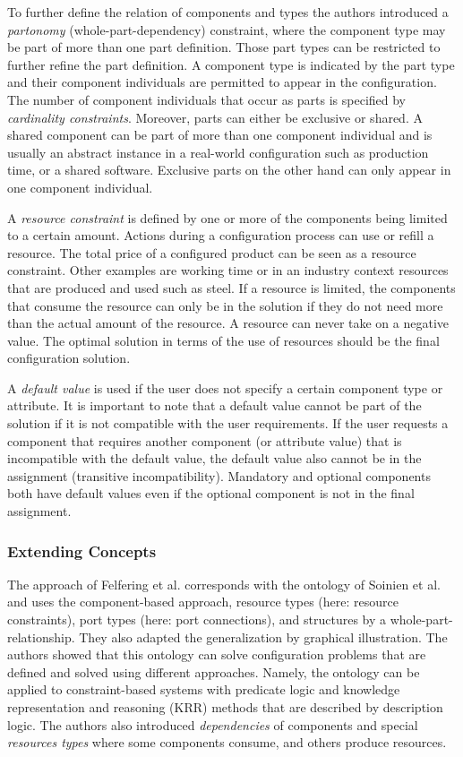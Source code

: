 To further define the relation of components and types the authors introduced a \textit{partonomy} (whole-part-dependency) constraint, where the component type may be part of more than one part definition. Those part types can be restricted to further refine the part definition. A component type is indicated by the part type and their component individuals are permitted to appear in the configuration. The number of component individuals that occur as parts is specified by \textit{cardinality constraints}. Moreover, parts can either be exclusive or shared. A shared component can be part of more than one component individual and is usually an abstract instance in a real-world configuration such as production time, or a shared software. Exclusive parts on the other hand can only appear in one component individual. \newline

A \textit{resource constraint} is defined by one or more of the components being limited to a certain amount. Actions during a configuration process can use or refill a resource. The total price of a configured product can be seen as a resource constraint. Other examples are working time or in an industry context resources that are produced and used such as steel. If a resource is limited, the components that consume the resource can only be in the solution if they do not need more than the actual amount of the resource. A resource can never take on a negative value. The optimal solution in terms of the use of resources should be the final configuration solution. \newline

A \textit{default value} is used if the user does not specify a certain component type or attribute. It is important to note that a default value cannot be part of the solution if it is not compatible with the user requirements. If the user requests a component that requires another component (or attribute value) that is incompatible with the default value, the default value also cannot be in the assignment (transitive incompatibility). Mandatory and optional components both have default values even if the optional component is not in the final assignment.


\subsubsection{Extending Concepts}
The approach of Felfering et al. \cite{fefrjastza03a} corresponds with the ontology of Soinien et al. \cite{sotimasu98a} and uses the component-based approach, resource types (here: resource constraints), port types (here: port connections), and structures by a whole-part-relationship. They also adapted the generalization by graphical illustration. The authors showed that this ontology can solve configuration problems that are defined and solved using different approaches. Namely, the ontology can be applied to constraint-based systems with predicate logic and knowledge representation and reasoning (KRR) methods that are described by description logic. The authors also introduced \textit{dependencies} of components and special \textit{resources types} where some components consume, and others produce resources.  \newline

